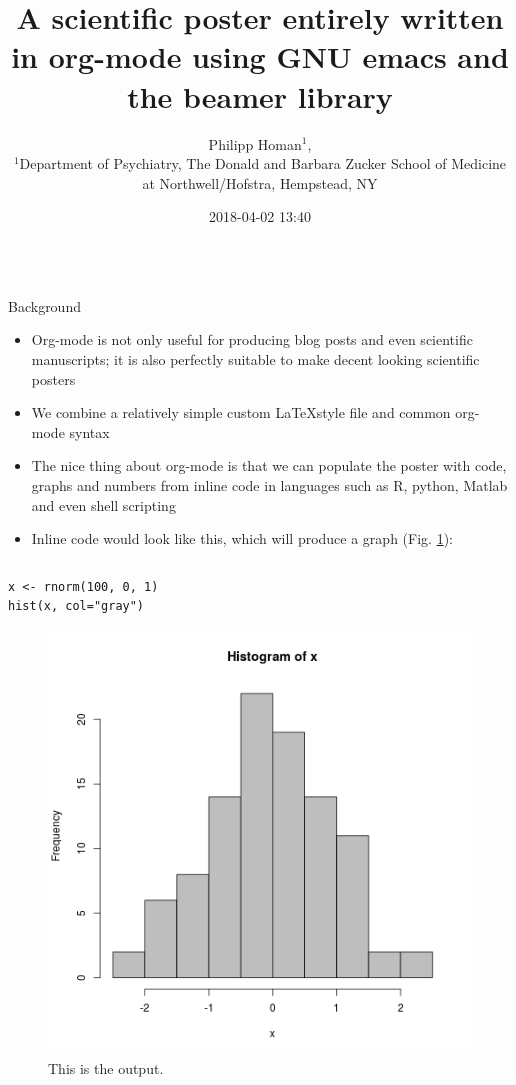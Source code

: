 \documentclass[final]{beamer}
\date{}
\author{
Philipp Homan$^{1}$,
\\
\normalsize{$^{1}$Department of Psychiatry,}
\normalsize{The Donald and Barbara Zucker}
\normalsize{School of Medicine at Northwell/Hofstra,}
\normalsize{Hempstead, NY}
}
\date{2018-04-02 13:40}
\title{A scientific poster entirely written in org-mode using GNU emacs and the beamer library}
\begin{document}
\begin{frame}[fragile,label={sec:orgd2177c7}]{}
 \begin{columns}
\begin{column}[t]{0.45\columnwidth}
\begin{block}{Background}
\begin{itemize}
\item Org-mode is not only useful for producing blog posts and even
scientific manuscripts; it is also perfectly suitable to make 
decent looking scientific posters
\item We combine a relatively simple custom \LaTeX style file and common
org-mode syntax
\item The nice thing about org-mode is that we can populate the poster with
code, graphs and numbers from inline code in languages such as R,
python, Matlab and even shell scripting
\item Inline code would look like this, which will produce a graph
(Fig. \ref{fig:orgeb3e62b}):
\end{itemize}

\begin{columns}
\begin{column}[T]{0.48\columnwidth}
\begin{verbatim}
x <- rnorm(100, 0, 1)
hist(x, col="gray")
\end{verbatim}


\begin{figure}[htbp]
\centering
\includegraphics[width=.9\linewidth]{3.png}
\caption{\label{fig:orgeb3e62b}
This is the output.}
\end{figure}
\end{column}
\end{columns}
\end{block}


\end{column}
\end{columns}
\end{frame}
\end{document}
